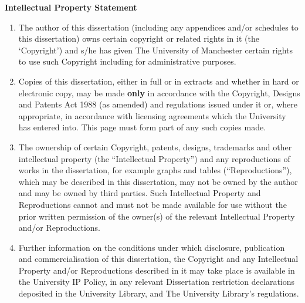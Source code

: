 \thispagestyle{plain}
\begin{center}{\huge\bf Intellectual Property Statement\par}\end{center}
\vspace{1em}

\begin{enumerate}[label=\roman*.]

\item The author of this dissertation (including any appendices and/or schedules to this dissertation) owns certain copyright or related rights in it (the `Copyright') and s/he has given The University of Manchester certain rights to use such Copyright including for administrative purposes.

\item Copies of this dissertation, either in full or in extracts and whether in hard or electronic copy, may be made \textbf{only} in accordance with the Copyright, Designs and Patents Act 1988 (as amended) and regulations issued under it or, where appropriate, in accordance with licensing agreements which the University has entered into. This page must form part of any such copies made.

\item The ownership of certain Copyright, patents, designs, trademarks and other intellectual property (the ``Intellectual Property'') and any reproductions of works in the dissertation, for example graphs and tables (``Reproductions''), which may be described in this dissertation, may not be owned by the author and may be owned by third parties. Such Intellectual Property and Reproductions cannot and must not be made available for use without the prior written permission of the owner(s) of the relevant Intellectual Property and/or Reproductions.

\item Further information on the conditions under which disclosure, publication and commercialisation of this dissertation, the Copyright and any Intellectual Property and/or Reproductions described in it may take place is available in the University IP Policy, in any relevant Dissertation restriction declarations deposited in the University Library, and The University Library's regulations.

\end{enumerate}

\clearpage

